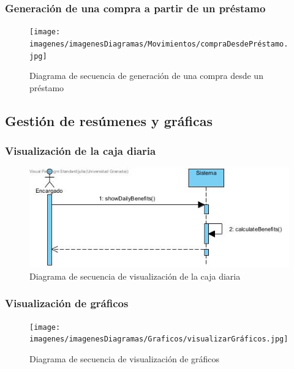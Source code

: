 \subsubsection{Generación de una compra a partir de un préstamo}

\begin{figure}[H]
	\centering
	\texttt{[image: imagenes/imagenesDiagramas/Movimientos/compraDesdePréstamo.jpg]}
	\caption{Diagrama de secuencia de generación de una compra desde un préstamo}
	\label{fig:seqdiag27}
\end{figure}

\subsection{Gestión de resúmenes y gráficas}

\subsubsection{Visualización de la caja diaria}

\begin{figure}[H]
	\centering
	\includegraphics[width=1\textwidth]{imagenes/imagenesDiagramas/Graficos/visualizarCajaDiaria.jpg}
	\caption{Diagrama de secuencia de visualización de la caja diaria}
	\label{fig:seqdiag28}
\end{figure}

\subsubsection{Visualización de gráficos}

\begin{figure}[H]
	\centering
	\texttt{[image: imagenes/imagenesDiagramas/Graficos/visualizarGráficos.jpg]}
	\caption{Diagrama de secuencia de visualización de gráficos}
	\label{fig:seqdiag29}
\end{figure}

